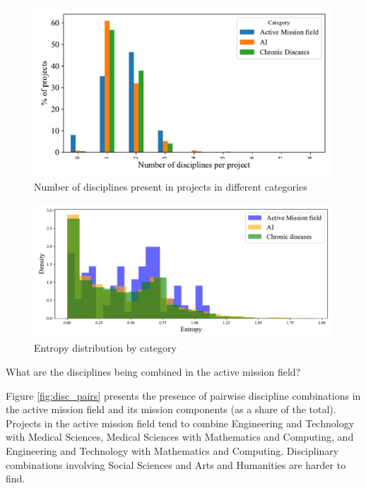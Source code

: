 \documentclass[11pt]{article}
\begin{document}
\begin{figure}[!ht]
    \centering
    \includegraphics[width=\textwidth]{figures/fig_10_disc_discrete.pdf}
    \caption{Number of disciplines present in projects in different categories}
    \label{fig:disc_count_discrete}
\end{figure}

\begin{figure}[!ht]
    \centering
    \includegraphics[width=\textwidth]{figures/fig_11_disc_histogram.pdf}
    \caption{Entropy distribution by category}
    \label{fig:disc_count_discrete}
\end{figure}

What are the disciplines being combined in the active mission field?

Figure \ref{fig:disc_pairs} presents the presence of pairwise discipline combinations in the active mission field and its mission components (as a share of the total). Projects in the active mission field tend to combine Engineering and Technology with Medical Sciences, Medical Sciences with Mathematics and Computing, and Engineering and Technology with Mathematics and Computing. Disciplinary combinations involving Social Sciences and Arts and Humanities are harder to find.
\end{document}
